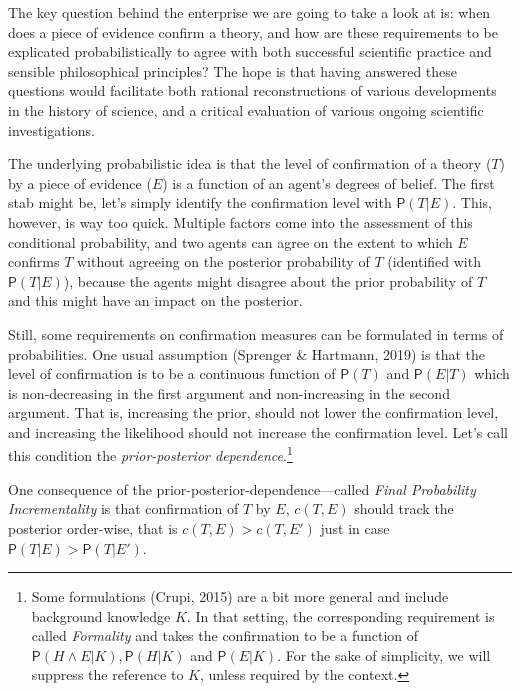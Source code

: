 \documentclass[10pt,dvipsnames,enabledeprecatedfontcommands]{scrartcl}
\newcommand{\et}{\wedge}
\newcommand{\pr}[1]{\mathsf{P}(#1)}
\begin{document}

The key question behind the enterprise we are going to take a look at
is: when does a piece of evidence confirm a theory, and how are these
requirements to be explicated probabilistically to agree with both
successful scientific practice and sensible philosophical principles?
The hope is that having answered these questions would facilitate both
rational reconstructions of various developments in the history of
science, and a critical evaluation of various ongoing scientific
investigations.

The underlying probabilistic idea is that the level of confirmation of a
theory (\(T\)) by a piece of evidence (\(E\)) is a function of an
agent's degrees of belief. The first stab might be, let's simply
identify the confirmation level with \(\pr{T \vert E}\). This, however,
is way too quick. Multiple factors come into the assessment of this
conditional probability, and two agents can agree on the extent to which
\(E\) confirms \(T\) without agreeing on the posterior probability of
\(T\) (identified with \(\pr{T \vert E}\)), because the agents might
disagree about the prior probability of \(T\) and this might have an
impact on the posterior.

Still, some requirements on confirmation measures can be formulated in
terms of probabilities. One usual assumption (Sprenger \& Hartmann,
2019) is that the level of confirmation is to be a continuous function
of \(\pr{T}\) and \(\pr{E\vert T}\) which is non-decreasing in the first
argument and non-increasing in the second argument. That is, increasing
the prior, should not lower the confirmation level, and increasing the
likelihood should not increase the confirmation level. Let's call this
condition the \emph{prior-posterior dependence}.\footnote{Some
  formulations (Crupi, 2015) are a bit more general and include
  background knowledge \(K\). In that setting, the corresponding
  requirement is called \emph{Formality} and takes the confirmation to
  be a function of \(\pr{H \et E \vert K}, \pr{H\vert K}\) and
  \(\pr{E\vert K}\). For the sake of simplicity, we will suppress the
  reference to \(K\), unless required by the context.}

One consequence of the prior-posterior-dependence---called
\emph{Final Probability Incrementality} is that confirmation of \(T\) by
\(E\), \(c(T,E)\) should track the posterior order-wise, that is
\(c(T,E)>c(T,E')\) just in case \(\pr{T\vert E} > \pr{T\vert E'}\).
\end{document}

